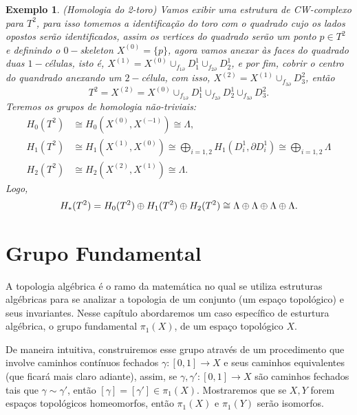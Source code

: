 \documentclass[12pt]{book}
\newtheorem{exemplo}[teorema]{Exemplo}
\newcommand{\celula}[2]{D^{#1}_{#2}}
\newcommand{\grupofundamental}[1]{\pi_{1}(#1)}
\newcommand{\homologia}[2]{H_{#1}(#2)}
\newcommand{\homologiarelcel}[3]{H_{#1}(D^{#2}_{#3}, \partial D^{#2}_{#3})}
\newcommand{\homologiarelskele}[3]{H_{#1}(X^{(#2)}, X^{(#3)})}
\newcommand{\somadir}[1]{\bigoplus \limits_{#1}}
\newcommand{\skeleton}[1]{X^{(#1)}}
\begin{document}
	\begin{exemplo}
		(Homologia do 2-toro) Vamos exibir uma estrutura de CW-complexo para $T^{2}$, para isso tomemos a identificação do toro com o quadrado cujo os lados opostos serão identificados, assim os vertices do quadrado serão um ponto $p \in T^{2}$ e definindo o $0-$skeleton $\skeleton{0} = \{p\}$, agora vamos anexar às faces do quadrado duas $1-$células, isto é, $\skeleton{1} = \skeleton{0}\cup_{f_{1\partial}}\celula{1}{1}\cup_{f_{2\partial}}\celula{1}{2}$, e por fim, cobrir o centro do quandrado anexando um $2-$célula, com isso, $\skeleton{2} = \skeleton{1}\cup_{f_{3\partial}}\celula{2}{3}$, então
		$$
		T^{2} =\skeleton{2} = \skeleton{0}\cup_{f_{1\partial}}\celula{1}{1}\cup_{f_{2\partial}}\celula{1}{2}\cup_{f_{3\partial}}\celula{2}{3}.
		$$
		Teremos os grupos de homologia não-triviais:
		$$
			\begin{aligned}
			\homologia{0}{T^{2}} &\cong \homologiarelskele{0}{0}{-1} \cong \Lambda,
			\\
			\homologia{1}{T^{2}} &\cong \homologiarelskele{1}{1}{0} \cong \somadir{i=1,2}\homologiarelcel{1}{1}{i} \cong \somadir{i=1,2}\Lambda
			\\
			\homologia{2}{T^{2}} &\cong \homologiarelskele{2}{2}{1} \cong \Lambda.
			\end{aligned}
		$$
		Logo,
		$$
		\\
		\homologia{*}{T^{2}} = \homologia{0}{T^{2}}\oplus\homologia{1}{T^{2}} \oplus\homologia{2}{T^{2}}\cong \Lambda\oplus\Lambda\oplus\Lambda\oplus\Lambda.
		$$
	\end{exemplo}	
	
	\chapter{Grupo Fundamental}
	A topologia algébrica é o ramo da matemática no qual se utiliza estruturas algébricas para se analizar a topologia de um conjunto (um espaço topológico) e seus invariantes. Nesse capítulo abordaremos um caso específico de esturtura algébrica, o grupo fundamental $\grupofundamental{X}$, de um espaço topológico $X$. 
	
	De maneira intuitiva, construiremos esse grupo através de um procedimento que involve caminhos contínuos fechados $\gamma:[0,1]\to X$ e seus caminhos equivalentes (que ficará mais claro adiante), assim, se $\gamma, \gamma':[0,1]\to X$ são caminhos fechados tais que $\gamma \sim \gamma'$, então $[\gamma] = [\gamma'] \in \grupofundamental{X}$. Mostraremos que se $X,Y$ forem espaços topológicos homeomorfos, então $\grupofundamental{X}$ e $\grupofundamental{Y}$ serão isomorfos.
	
\end{document}
